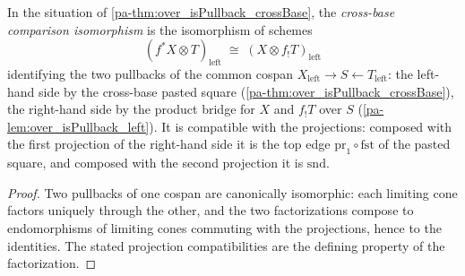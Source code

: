 \begin{definition}
  \label{pa-def:crossBaseIso}
  \leanok

  In the situation of \ref{pa-thm:over_isPullback_crossBase}, the \emph{cross-base
  comparison isomorphism} is the isomorphism of schemes
  \[
    (f^{*}X \otimes T)_{\mathrm{left}} \;\cong\; (X \otimes f_{!}T)_{\mathrm{left}}
  \]
  identifying the two pullbacks of the common cospan
  \(X_{\mathrm{left}} \to S \leftarrow T_{\mathrm{left}}\): the left-hand side by the
  cross-base pasted square (\ref{pa-thm:over_isPullback_crossBase}), the right-hand side
  by the product bridge for \(X\) and \(f_{!}T\) over \(S\)
  (\ref{pa-lem:over_isPullback_left}). It is compatible with the projections: composed
  with the first projection of the right-hand side it is the top edge
  \(\mathrm{pr}_1 \circ \mathrm{fst}\) of the pasted square, and composed with the
  second projection it is \(\mathrm{snd}\).
\end{definition}
\begin{proof}
  \leanok
  Two pullbacks of one cospan are canonically isomorphic: each limiting cone factors
  uniquely through the other, and the two factorizations compose to endomorphisms of
  limiting cones commuting with the projections, hence to the identities. The stated
  projection compatibilities are the defining property of the factorization.
\end{proof}

